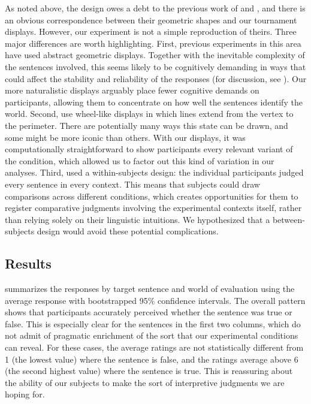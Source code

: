 \documentclass[leqno]{article}
\begin{document}
As noted above, the design owes a debt to the previous work of
\citet{Geurts:Pouscoulous:2009} and \citet{Chemla:Spector:2011}, and
there is an obvious correspondence between their geometric shapes and
our tournament displays. However, our experiment is not a simple
reproduction of theirs. Three major differences are worth
highlighting. First, previous experiments in this area have used
abstract geometric displays. Together with the inevitable complexity
of the sentences involved, this seems likely to be cognitively
demanding in ways that could affect the stability and reliability of
the responses (for discussion, see \citealt{Clifton:Dube:2010}). Our
more naturalistic displays arguably place fewer cognitive demands on
participants, allowing them to concentrate on how well the sentences
identify the world. Second, \citeauthor{Chemla:Spector:2011} use
wheel-like displays in which lines extend from the vertex to the
perimeter. There are potentially many ways this state can be drawn,
and some might be more iconic than others. With our displays, it was
computationally straightforward to show participants every relevant
variant of the condition, which allowed us to factor out this kind of
variation in our analyses. Third, \citeauthor{Chemla:Spector:2011}
used a within-subjects design: the individual participants judged
every sentence in every context. This means that subjects could draw
comparisons across different conditions, which creates opportunities
for them to register comparative judgments involving the experimental
contexts itself, rather than relying solely on their linguistic
intuitions. We hypothesized that a between-subjects design would avoid
these potential complications.


\subsection{Results}\label{sec:exp1:results}


 summarizes the responses by target sentence
and world of evaluation using the average response with bootstrapped
95\% confidence intervals. The overall pattern shows that participants
accurately perceived whether the sentence was true or false. This is
especially clear for the sentences in the first two columns, which do
not admit of pragmatic enrichment of the sort that our experimental
conditions can reveal. For these cases, the average ratings are not
statistically different from 1 (the lowest value) where the sentence
is false, and the ratings average above 6 (the second highest value)
where the sentence is true. This is reassuring about the ability of
our subjects to make the sort of interpretive judgments we are hoping
for.
\end{document}
